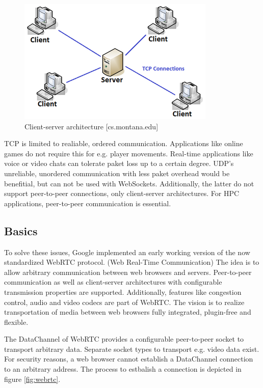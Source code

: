 \begin{figure}[htp]
  \begin{center}
    \includegraphics[width=0.9\columnwidth]{resources/websocket.png}
  \end{center}
  \caption{Client-server architecture [cs.montana.edu]}
  \label{fig:websocket}
\end{figure}

TCP is limited to realiable, ordered communication. Applications like online games do not require this for e.g. player movements. Real-time applications like voice or video chats can tolerate paket loss up to a certain degree. UDP's unreliable, unordered communication with less paket overhead would be benefitial, but can not be used with WebSockets. Additionally, the latter do not support peer-to-peer connections, only client-server architectures. For HPC applications, peer-to-peer communication is essential.


\subsection{Basics}

To solve these issues, Google implemented an early working version of the now standardized WebRTC protocol. (Web Real-Time Communication) The idea is to allow arbitrary communication between web browsers and servers. Peer-to-peer communication as well as client-server architectures with configurable transmission properties are supported. Additionally, features like congestion control, audio and video codecs are part of WebRTC. The vision is to realize transportation of media between web browsers fully integrated, plugin-free and flexible.

The DataChannel of WebRTC provides a configurable peer-to-peer socket to transport arbitrary data. Separate socket types to transport e.g. video data exist. For security reasons, a web browser cannot establish a DataChannel connection to an arbitrary address. The process to estbalish a connection is depicted in figure \ref{fig:webrtc}.


